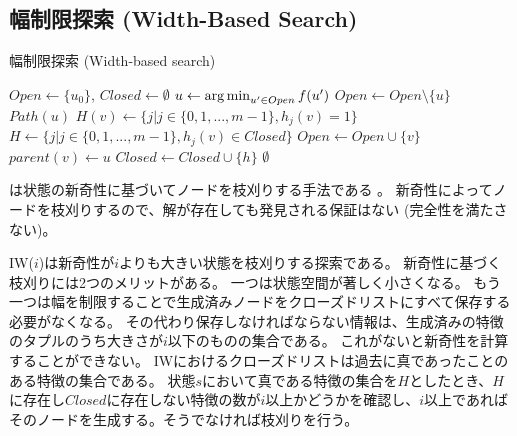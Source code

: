 
\subsection{幅制限探索 (Width-Based Search)}
\label{sec:width-based-search}


\begin{algorithm}
\caption{幅制限探索 (Width-based search)}
\label{alg:width-based-search}
	$Open \leftarrow \{u_0\}$, $Closed \leftarrow \emptyset$\;
	 {
                $u \leftarrow \operatorname*{arg\,min}_{u' \in Open} f(u')$ \;
		$Open \leftarrow Open \setminus \{u\} $\;
		 {
			\Return $Path(u)$\;
		}
		 {
                  $H(v) \leftarrow \{j | j \in \{0, 1, ..., m-1\}, h_j(v) = 1\}$\;
                  $H \leftarrow \{j | j \in \{0, 1, ..., m-1\}, h_j(v) \in Closed\}$\;
                   {
                    $Open \leftarrow Open \cup \{v\}$\;
                    $parent(v) \leftarrow u$\;
                  }
                   {
                    $Closed \leftarrow Closed \cup \{h\}$\;
                  }
		}
 	}
	\Return $\emptyset$\;
\end{algorithm}

は状態の新奇性に基づいてノードを枝刈りする手法である \cite{lipovetzkyg12}。
新奇性によってノードを枝刈りするので、解が存在しても発見される保証はない (完全性を満たさない)。

IW($i$)は新奇性が$i$よりも大きい状態を枝刈りする探索である。
新奇性に基づく枝刈りには2つのメリットがある。
一つは状態空間が著しく小さくなる。
もう一つは幅を制限することで生成済みノードをクローズドリストにすべて保存する必要がなくなる。
その代わり保存しなければならない情報は、生成済みの特徴のタプルのうち大きさが$i$以下のものの集合である。
これがないと新奇性を計算することができない。
IWにおけるクローズドリストは過去に真であったことのある特徴の集合である。
状態$s$において真である特徴の集合を$H$としたとき、$H$に存在し$Closed$に存在しない特徴の数が$i$以上かどうかを確認し、$i$以上であればそのノードを生成する。そうでなければ枝刈りを行う。

